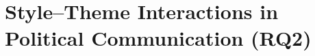 \documentclass[12pt,a4paper]{report}
\begin{document}
\section{Style--Theme Interactions in Political Communication (RQ2)}
\label{sec:rq2_discussion}



\end{document}
